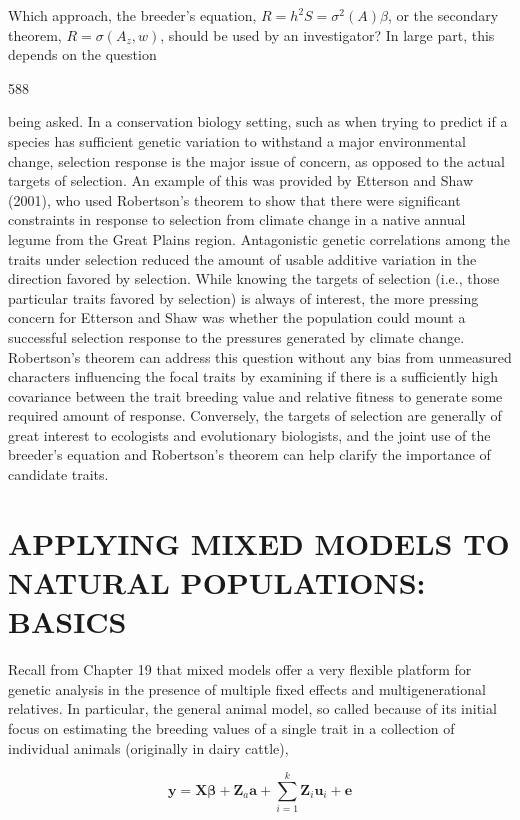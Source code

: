 \documentclass{article}
\begin{document}
Which approach, the breeder’s equation,  $ R = h^2 S = \sigma^2(A)\beta $, or the secondary theorem,  $ R = \sigma(A_z, w) $, should be used by an investigator? In large part, this depends on the question

588

being asked. In a conservation biology setting, such as when trying to predict if a species has sufficient genetic variation to withstand a major environmental change, selection response is the major issue of concern, as opposed to the actual targets of selection. An example of this was provided by Etterson and Shaw (2001), who used Robertson's theorem to show that there were significant constraints in response to selection from climate change in a native annual legume from the Great Plains region. Antagonistic genetic correlations among the traits under selection reduced the amount of usable additive variation in the direction favored by selection. While knowing the targets of selection (i.e., those particular traits favored by selection) is always of interest, the more pressing concern for Etterson and Shaw was whether the population could mount a successful selection response to the pressures generated by climate change. Robertson's theorem can address this question without any bias from unmeasured characters influencing the focal traits by examining if there is a sufficiently high covariance between the trait breeding value and relative fitness to generate some required amount of response. Conversely, the targets of selection are generally of great interest to ecologists and evolutionary biologists, and the joint use of the breeder's equation and Robertson's theorem can help clarify the importance of candidate traits.

\section{APPLYING MIXED MODELS TO NATURAL POPULATIONS: BASICS}
Recall from Chapter 19 that mixed models offer a very flexible platform for genetic analysis in the presence of multiple fixed effects and multigenerational relatives. In particular, the general animal model, so called because of its initial focus on estimating the breeding values of a single trait in a collection of individual animals (originally in dairy cattle),

\begin{equation}
\mathbf{y}=\mathbf{X}\boldsymbol{\beta}+\mathbf{Z}_{a}\mathbf{a}+\sum_{i=1}^{k}\mathbf{Z}_{i}\mathbf{u}_{i}+\mathbf{e}
\tag{20.22a}
\label{eq:20_22a}
\end{equation}
\end{document}
